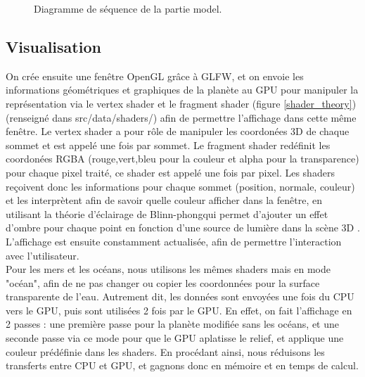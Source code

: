 \documentclass[a4paper]{article}
\begin{document}
\begin{figure}[!ht]
\centering
\caption{Diagramme de séquence de la partie model.}
\label{seqmodel}
\end{figure}

\subsection{Visualisation}

On crée ensuite une fenêtre OpenGL grâce à GLFW, et on envoie les informations géométriques et graphiques de la planète au GPU pour manipuler la représentation via le vertex shader et le fragment shader (figure \ref{shader_theory})(renseigné dans src/data/shaders/) afin de permettre l'affichage dans cette même fenêtre. Le vertex shader a pour rôle de manipuler les coordonées 3D de chaque sommet et est appelé une fois par sommet. Le fragment shader redéfinit les coordonées RGBA (rouge,vert,bleu pour la couleur et alpha pour la transparence) pour chaque pixel traité, ce shader est appelé une fois par pixel. Les shaders reçoivent donc les informations pour chaque sommet (position, normale, couleur) et les interprètent afin de savoir quelle couleur afficher dans la fenêtre, en utilisant la théorie d'éclairage de Blinn-phong\protect\footnotemark  qui permet d'ajouter un effet d'ombre pour chaque point en fonction d'une source de lumière dans la scène 3D \cite{BlinnPhong}. L'affichage est ensuite constamment actualisée, afin de permettre l'interaction avec l'utilisateur.\\
Pour les mers et les océans, nous utilisons les mêmes shaders mais en mode "océan", afin de ne pas changer ou copier les coordonnées pour la surface transparente de l'eau. Autrement dit, les données sont envoyées une fois du CPU vers le GPU, puis sont utilisées 2 fois par le GPU. En effet, on fait l'affichage en 2 passes : une première passe pour la planète modifiée sans les océans, et une seconde passe via ce mode pour que le GPU aplatisse le relief, et applique une couleur prédéfinie dans les shaders. En procédant ainsi, nous réduisons les transferts entre CPU et GPU, et gagnons donc en mémoire et en temps de calcul.\\
\end{document}
